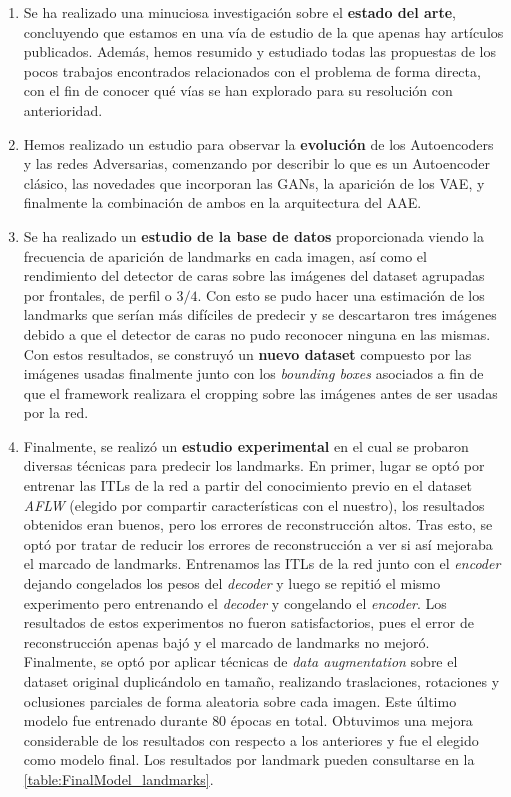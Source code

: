 \begin{enumerate}
    \item Se ha realizado una minuciosa investigación sobre el \textbf{estado del arte}, concluyendo que estamos en una vía de estudio de la que apenas hay artículos publicados. Además, hemos resumido y estudiado todas las propuestas de los pocos trabajos encontrados relacionados con el problema de forma directa, con el fin de conocer qué vías se han explorado para su resolución con anterioridad.
    \item Hemos realizado un estudio para observar la \textbf{evolución} de los Autoencoders y las redes Adversarias, comenzando por describir lo que es un Autoencoder clásico, las novedades que incorporan las GANs, la aparición de los VAE, y finalmente la combinación de ambos en la arquitectura del AAE.
    \item Se ha realizado un \textbf{estudio de la base de datos} proporcionada viendo la frecuencia de aparición de landmarks en cada imagen, así como el rendimiento del detector de caras sobre las imágenes del dataset agrupadas por frontales, de perfil o $3/4$. Con esto se pudo hacer una estimación de los landmarks que serían más difíciles de predecir y se descartaron tres imágenes debido a que el detector de caras no pudo reconocer ninguna en las mismas. Con estos resultados, se construyó un \textbf{nuevo dataset} compuesto por las imágenes usadas finalmente junto con los \textit{bounding boxes} asociados a fin de que el framework realizara el cropping sobre las imágenes antes de ser usadas por la red.
    \item Finalmente, se realizó un \textbf{estudio experimental} en el cual se probaron diversas técnicas para predecir los landmarks. En primer, lugar se optó por entrenar las ITLs de la red a partir del conocimiento previo en el dataset \textit{AFLW} (elegido por compartir características con el nuestro), los resultados obtenidos eran buenos, pero los errores de reconstrucción altos. Tras esto, se optó por tratar de reducir los errores de reconstrucción a ver si así mejoraba el marcado de landmarks. Entrenamos las ITLs de la red junto con el \textit{encoder} dejando congelados los pesos del \textit{decoder} y luego se repitió el mismo experimento pero entrenando el \textit{decoder} y congelando el \textit{encoder}. Los resultados de estos experimentos no fueron satisfactorios, pues el error de reconstrucción apenas bajó y el marcado de landmarks no mejoró. Finalmente, se optó por aplicar técnicas de \textit{data augmentation} sobre el dataset original duplicándolo en tamaño, realizando traslaciones, rotaciones y oclusiones parciales de forma aleatoria sobre cada imagen. Este último modelo fue entrenado durante $80$ épocas en total. Obtuvimos una mejora considerable de los resultados con respecto a los anteriores y fue el elegido como modelo final. Los resultados por landmark pueden consultarse en la \autoref{table:FinalModel_landmarks}.
\end{enumerate}


